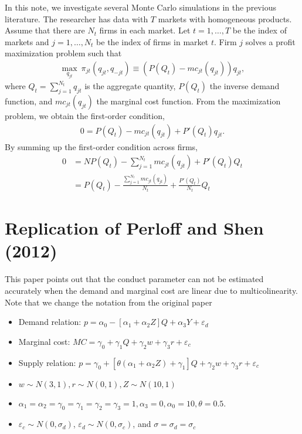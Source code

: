 \documentclass[11pt]{article}
\numberwithin{figure}{section}
\theoremstyle{definition}
\newcommand{\0}{\mathbf{0}}
\begin{document}
In this note, we investigate several Monte Carlo simulations in the previous literature.
The researcher has data with $T$ markets with homogeneous products.
Assume that there are $N_t$ firms in each market.
Let $t = 1,\ldots, T$ be the index of markets and $j = 1, \ldots, N_t$ be the index of firms in market $t$.
Firm $j$ solves a profit maximization problem such that
\begin{align*}
    \max_{q_{jt}} \ \pi_{jt}(q_{jt}, q_{-jt}) \equiv (P(Q_t) - mc_{jt}(q_{jt}))q_{jt},
\end{align*}
where $Q_t = \sum_{j = 1}^{N_t} q_{jt}$ is the aggregate quantity, $P(Q_t)$ the inverse demand function, and $mc_{jt}(q_{jt})$ the marginal cost function.
From the maximization problem, we obtain the first-order condition,
\begin{align*}
    0 = P(Q_{t}) - mc_{jt}(q_{jt}) + P'(Q_{t})q_{jt}.
\end{align*}
By summing up the first-order condition across firms, 
\begin{align*}
    0 &= NP(Q_t) - \sum_{j = 1}^{N_t} mc_{jt}(q_{jt}) + P'(Q_t)Q_{t}\\
    & =  P(Q_t) - \frac{\sum_{j = 1}^{N_t} mc_{jt}(q_{jt})}{N_{t}} + \frac{P'(Q_t)}{N_t}Q_{t}
\end{align*}


\section{Replication of Perloff and Shen (2012)}
This paper points out that the conduct parameter can not be estimated accurately when the demand and marginal cost are linear due to multicolinearity. Note that we change the notation from the original paper
\begin{itemize}
    \item Demand relation: $p = \alpha_0 - [\alpha_1 + \alpha_2Z] Q + \alpha_3Y + \varepsilon_d$
    \item Marginal cost: $ MC = \gamma_0  + \gamma_1 Q + \gamma_2 w + \gamma_3 r + \varepsilon_c$
    \item Supply relation: $p = \gamma_0 + [\theta(\alpha_1 + \alpha_2Z)+ \gamma_1] Q   + \gamma_2 w + \gamma_3 r + \varepsilon_c$
    \item $w \sim N (3, 1), r \sim N (0, 1), Z \sim N (10, 1)$
    \item $\alpha_1 = \alpha_2 = \gamma_0 = \gamma_1 = \gamma_2  = \gamma_3 = 1, \alpha_3 = 0, \alpha_0 = 10, \theta = 0.5.$
    \item $\varepsilon_c\sim N(0,\sigma_d)$, $\varepsilon_d \sim N(0,\sigma_c)$, and $\sigma = \sigma_d = \sigma_c$
\end{itemize}
\end{document}
